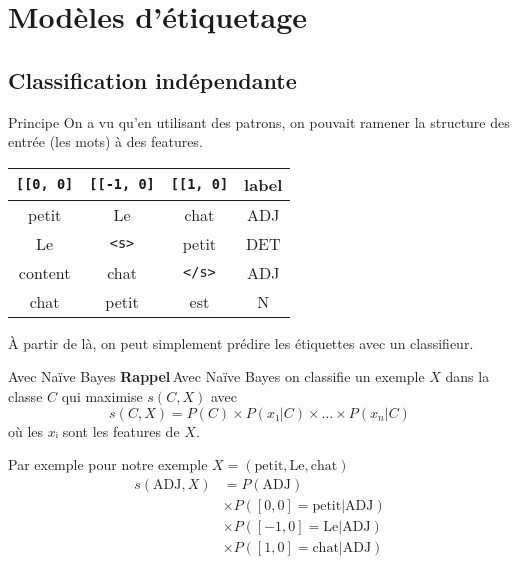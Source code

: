 \documentclass[hyperref={unicode}, xcolor={svgnames}, french]{beamer}
\begin{document}
\section{Modèles d'étiquetage}
\subsection{Classification indépendante}
\begin{frame}[fragile]{Principe}
	On a vu qu'en utilisant des patrons, on pouvait ramener la structure des entrée (les mots) à des features.

	\begin{table}
		\begin{tabu} to .9\textwidth {cccc}
			\texttt{[[0, 0]}	& \texttt{[[-1, 0]}	& \texttt{[[1, 0]}	& label\\
			\midrule
			petit	& Le	& chat	& ADJ\\
			Le	& \texttt{<s>}	& petit	& DET\\
			content	& chat	& \texttt{</s>}	& ADJ\\
			chat	& petit	& est	& N
		\end{tabu}
	\end{table}

	À partir de là, on peut simplement prédire les étiquettes avec un classifieur.
\end{frame}

\begin{frame}{Avec Naïve Bayes}
	\textbf{Rappel} Avec Naïve Bayes on classifie un exemple $X$ dans la classe $C$ qui maximise $s(C,X)$ avec
	\begin{equation}
		s(C,X) = P(C) × P(x₁|C) × … × P(x_n|C)
	\end{equation}
	où les $xᵢ$ sont les features de $X$.

	Par exemple pour notre exemple $X = (\text{petit}, \text{Le}, \text{chat})$
	\begin{equation}
		\begin{aligned}
			s(\text{ADJ}, X)
				&= P(\text{ADJ})\\
				&× P([0,0]=\text{petit}|\text{ADJ})\\
				&× P([-1,0]=\text{Le}|\text{ADJ})\\
				&× P([1,0]=\text{chat}|\text{ADJ})
		\end{aligned}
	\end{equation}
\end{frame}
\end{document}
